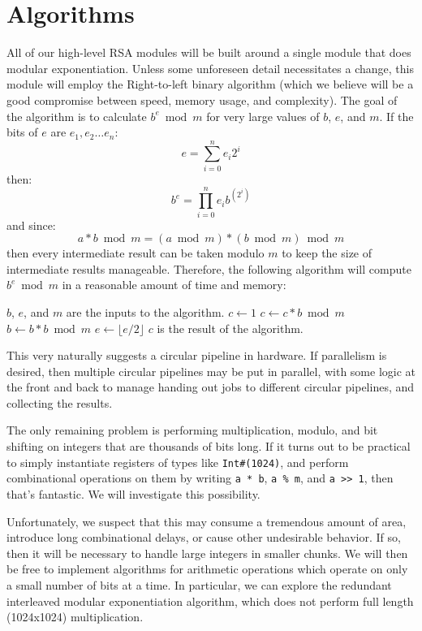 \documentclass[12pt]{article}
\begin{document}
\section{Algorithms}
All of our high-level RSA modules will be built around a single module that does modular exponentiation.
Unless some unforeseen detail necessitates a change, this module will employ the Right-to-left binary algorithm
(which we believe will be a good compromise between speed, memory usage, and complexity).
The goal of the algorithm is to calculate $b^e \bmod m$ for very large values of $b$, $e$, and $m$.
If the bits of $e$ are $e_1, e_2 \dots e_n$:
\begin{equation}
e = \sum_{i = 0}^{n} e_i 2^i
\end{equation}
then:
\begin{equation}
b^e = \prod_{i = 0}^{n} e_i b^{(2^i)}
\end{equation}
and since:
\begin{equation}
a * b \bmod m = (a \bmod m) * (b \bmod m) \bmod m
\end{equation}
then every intermediate result can be taken modulo $m$ to keep the size of intermediate results manageable.
Therefore, the following algorithm will compute $b^e \bmod m$ in a reasonable amount of time and memory:
\begin{algorithmic}
\State $b$, $e$, and $m$ are the inputs to the algorithm.
\State $c \gets 1$
		\State $c \gets c * b \bmod m$
	\EndIf
	\State $b \gets b * b \bmod m$
	\State $e \gets \lfloor e / 2 \rfloor$
\EndWhile
\State $c$ is the result of the algorithm.
\end{algorithmic}
This very naturally suggests a circular pipeline in hardware.
If parallelism is desired, then multiple circular pipelines may be put in parallel,
with some logic at the front and back to manage handing out jobs to different circular pipelines,
and collecting the results.

The only remaining problem is performing multiplication, modulo, and bit shifting
on integers that are thousands of bits long.
If it turns out to be practical to simply instantiate registers of types like {\tt Int\#(1024)},
and perform combinational operations on them by writing {\tt a~*~b}, {\tt a~\%~m}, and {\tt a~>>~1},
then that's fantastic.
We will investigate this possibility.

Unfortunately, we suspect that this may consume a tremendous amount of area,
introduce long combinational delays, or cause other undesirable behavior.
If so, then it will be necessary to handle large integers in smaller chunks.
We will then be free to implement algorithms for arithmetic operations
which operate on only a small number of bits at a time. In particular, we can 
explore the redundant interleaved modular exponentiation algorithm, which does
not perform full length (1024x1024) multiplication. 
\end{document}
